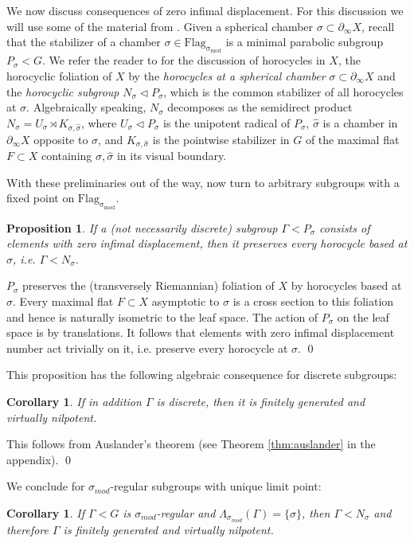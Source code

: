\documentclass[12pt]{article}
\theoremstyle{boldplain}
\newtheorem{cor}[equation]{Corollary}
\newtheorem{prop}[equation]{Proposition}
\theoremstyle{bolddefinition}
\numberwithin{equation}{section}
\def\Ga{\Gamma}
\def\si{\sigma}
\def\Flags{\operatorname{Flag_{\si_{mod}}}}
\def\geo{\partial_{\infty}}
\def\LasGa{\Lambda_{\sigma_{mod}}(\Gamma)}
\def\simod{\si_{mod}}
\begin{document}
\medskip
We now discuss consequences of zero infimal displacement. {For this discussion we will use some of the material from \cite{anolec}. 
Given a spherical chamber $\si\subset \geo X$, recall that the stabilizer of a chamber $\si\in\Flags$ is a minimal parabolic subgroup $P_{\si}<G$. We refer the reader to  \cite[sections 2.10 and 2.11, Remark 2.28]{anolec} for the discussion of horocycles in $X$, the horocyclic foliation of $X$ by the {\em horocycles at a spherical chamber} $\si\subset \geo X$ and the {\em horocyclic subgroup} $N_{\si}\triangleleft P_{\si}$, which is the common stabilizer of all horocycles at $\si$. Algebraically speaking,  $N_\si$ decomposes as the semidirect product $N_{\si}=U_{\si}\rtimes K_{\si,\hat\si}$,  where $U_{\si} \triangleleft P_{\si}$ is the unipotent radical of $P_{\si}$, 
$\hat\si$ is a chamber in $\geo X$ opposite to $\si$, 
and $K_{\si,\hat\si}$ is the pointwise stabilizer in $G$ of the maximal flat $F\subset X$ containing $\si, \hat\si$ in its visual boundary. 
}

{With these preliminaries out of the way, now turn to arbitrary subgroups with a fixed point on $\Flags$.} 

\begin{prop}
If a (not necessarily discrete) subgroup $\Ga<P_{\si}$ consists of elements with zero infimal displacement,
then it preserves every horocycle based at $\si$,
i.e. $\Ga<N_{\si}$.
\end{prop}


\proof
$P_{\si}$ preserves the (transversely Riemannian) foliation of $X$ by horocycles based at $\si$.
Every maximal flat $F\subset X$ asymptotic to $\si$ is a cross section to this foliation 
and hence is naturally isometric to the leaf space.
The action of $P_{\si}$ on the leaf space is by translations. 
It follows that elements with zero infimal displacement number act trivially on it,
i.e. preserve every horocycle at $\si$.
\qed

\medskip
This proposition has the following algebraic consequence for discrete subgroups:

\begin{cor}
If in addition $\Ga$ is discrete, then it is finitely generated and virtually nilpotent.
\end{cor}
\proof
This follows from Auslander's theorem (see Theorem \ref{thm:auslander} in the appendix).
\qed

\medskip
We conclude for $\simod$-regular subgroups with unique limit point:
\begin{cor}
If $\Ga<G$ is  $\simod$-regular and $\LasGa=\{\si\}$,
then $\Ga<N_{\si}$ and therefore $\Ga$ is finitely generated and virtually nilpotent.
\end{cor}
\end{document}
